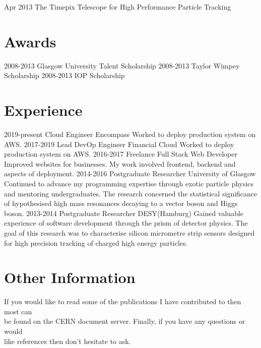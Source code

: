 \documentclass[]{twentysecondcv}
\begin{document}
\begin{twentyshort}
  \twentyitemshort
    {Apr 2013}
    {The Timepix Telescope for High Performance Particle Tracking}
\end{twentyshort}



\section*{Awards}

\begin{twentyshort}
  \twentyitemshort
    {2008-2013}
    {Glasgow University Talent Scholarship}
  \twentyitemshort
    {2008-2013}
    {Taylor Wimpey Scholarship}
  \twentyitemshort
    {2008-2013}
    {IOP Scholarship}
\end{twentyshort}


\section*{Experience}

\begin{twenty}
  \twentyitem
  {2019-present}
  {Cloud Engineer}
  {Encompass}
  {Worked to deploy production system on AWS.}
  \twentyitem
  {2017-2019}
  {Lead DevOp Engineer}
  {Financial Cloud}
  {Worked to deploy production system on AWS.}
  \twentyitem
    {2016-2017}
    {Freelance Full Stack Web Developer}
    {}
    {Improved websites for businesses. My work involved frontend, backend and aspects of deployment.}
  \twentyitem
    {2014-2016}
    {Postgraduate Researcher}
    {University of Glasgow}
    {Continued to advance my programming expertise through exotic particle physics and mentoring undergraduates.  The research concerned the  statistical significance of hypothesised high mass resonances decaying to a vector boson and Higgs boson.}
\twentyitem
    {2013-2014}
    {Postgraduate Researcher}
		{DESY(Hamburg)}
    {Gained valuable experience of software development through the prism of detector physics.  The goal of this research was to  characterise silicon micrometre strip sensors designed for high precision tracking of charged high energy particles.}

\end{twenty}
\section*{Other Information}
\hspace*{5pt}
If you would like to read some of the publications I have contributed to then most can \\ \hspace*{5pt} be found on the CERN document server. Finally, if you have any questions or would \\ \hspace*{5pt} like references then don't hesitate to ask. \\ 
\hspace*{5pt}
\vspace*{2pt}

\end{document}
